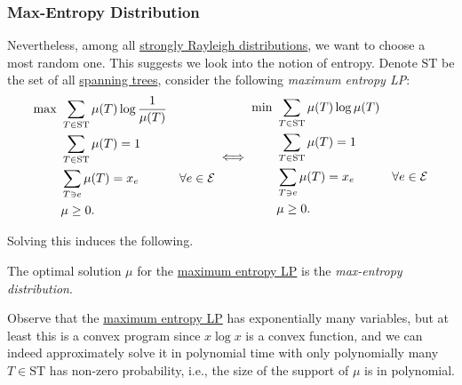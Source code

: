 \subsubsection{Max-Entropy Distribution}
Nevertheless, among all \hyperref[def:strongly-Rayleigh-distribution]{strongly Rayleigh distributions}, we want to choose a most random one. This suggests we look into the notion of entropy. Denote \(\mathrm{ST}\) be the set of all \hyperref[def:spanning-tree]{spanning trees}, consider the following \emph{maximum entropy LP}:
\begin{equation}\label{eq:max-entropy}
	\begin{aligned}
		\max~ & \sum_{T\in \mathrm{ST}} \mu (T) \log \frac{1}{\mu (T)}                                            \\
		      & \sum_{T\in \mathrm{ST} } \mu (T) = 1                                                              \\
		      & \sum_{T \ni e} \mu (T) = x_e                           & \forall e\in \mathcal{\MakeUppercase{e}} \\
		      & \mu \geq 0.
	\end{aligned} \iff
	\begin{aligned}
		\min~ & \sum_{T\in \mathrm{ST}} \mu (T) \log \mu (T)                                            \\
		      & \sum_{T\in \mathrm{ST} } \mu (T) = 1                                                    \\
		      & \sum_{T \ni e} \mu (T) = x_e                 & \forall e\in \mathcal{\MakeUppercase{e}} \\
		      & \mu \geq 0.
	\end{aligned}
\end{equation}

Solving this induces the following.
\begin{definition}\label{def:max-entropy-distribution}
	The optimal solution \(\mu \) for the \hyperref[eq:max-entropy]{maximum entropy LP} is the \emph{max-entropy distribution}.
\end{definition}

Observe that the \hyperref[eq:max-entropy]{maximum entropy LP} has exponentially many variables, but at least this is a convex program since \(x\log x\) is a convex function, and we can indeed approximately solve it in polynomial time with only polynomially many \(T\in \mathrm{ST} \) has non-zero probability, i.e., the size of the support of \(\mu\) is in polynomial.

